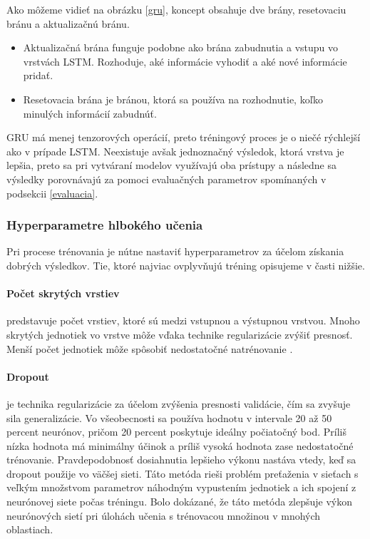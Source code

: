 Ako môžeme vidieť na obrázku \ref{gru}, koncept obsahuje dve brány, resetovaciu bránu a aktualizačnú bránu.

\begin{itemize}
    \item Aktualizačná brána funguje podobne ako brána zabudnutia a vstupu vo vrstvách LSTM. Rozhoduje, aké informácie vyhodiť a aké nové informácie pridať.
    \item Resetovacia brána je bránou, ktorá sa používa na rozhodnutie, koľko minulých informácií zabudnúť.
\end{itemize}

GRU má menej tenzorových operácií, preto tréningový proces je o niečé rýchlejší ako v prípade LSTM. Neexistuje avšak jednoznačný výsledok, ktorá vrstva je lepšia, preto sa pri vytváraní modelov využívajú oba prístupy a následne sa výsledky porovnávajú za pomoci evaluačných parametrov spomínaných v podsekcii \ref{evaluacia}. 

\subsubsection{Hyperparametre hlbokého učenia}
Pri procese trénovania je nútne nastaviť hyperparametrov za účelom získania dobrých výsledkov. Tie, ktoré najviac ovplyvňujú tréning opisujeme v časti nižšie.
\paragraph{Počet skrytých vrstiev} predstavuje počet vrstiev, ktoré sú medzi vstupnou a výstupnou vrstvou. Mnoho skrytých jednotiek vo vrstve môže vďaka technike regularizácie zvýšiť presnosť. Menší počet jednotiek môže spôsobiť nedostatočné natrénovanie \cite{hyperparams}.

\paragraph{Dropout} je technika regularizácie za účelom zvýšenia presnosti validácie, čím sa zvyšuje sila generalizácie. Vo všeobecnosti sa používa hodnotu v intervale 20 až 50 percent neurónov, pričom 20 percent poskytuje ideálny počiatočný bod. Príliš nízka hodnota má minimálny účinok a príliš vysoká hodnota zase nedostatočné trénovanie. Pravdepodobnosť dosiahnutia lepšieho výkonu nastáva vtedy, keď sa dropout použije vo väčšej sieti. Táto metóda rieši problém preťaženia v sieťach s veľkým množstvom parametrov náhodným vypustením jednotiek a ich spojení z neurónovej siete počas tréningu. Bolo dokázané, že táto metóda zlepšuje výkon neurónových sietí pri úlohách učenia s trénovacou množinou v mnohých oblastiach. 

